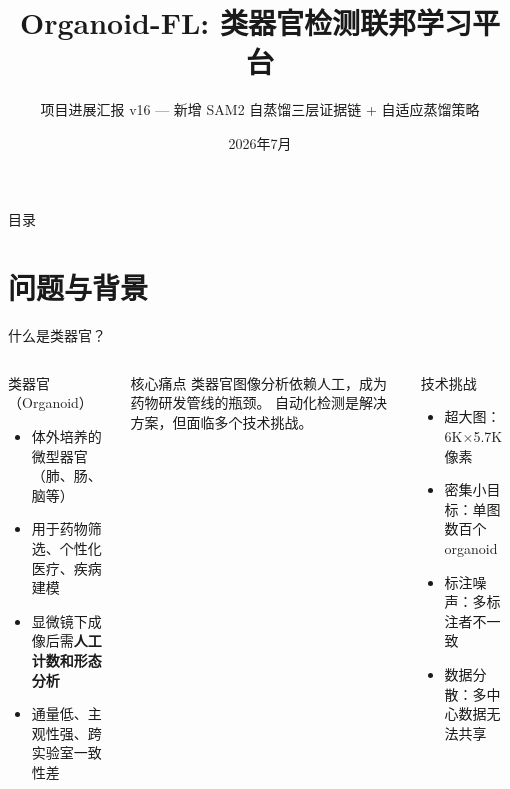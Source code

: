 \documentclass[aspectratio=169, 10pt]{beamer}
\title[Organoid-FL]{Organoid-FL: 类器官检测联邦学习平台}
\subtitle{项目进展汇报 v16 — 新增 SAM2 自蒸馏三层证据链 + 自适应蒸馏策略}
\date{2026年7月}
\begin{document}
\begin{frame}[plain]
  \titlepage
\end{frame}

\begin{frame}{目录}
  \tableofcontents
\end{frame}

\section{问题与背景}

\begin{frame}{什么是类器官？}
  \begin{columns}[T]
    \begin{block}{类器官（Organoid）}
      \begin{itemize}
        \item 体外培养的微型器官（肺、肠、脑等）
        \item 用于药物筛选、个性化医疗、疾病建模
        \item 显微镜下成像后需\textbf{人工计数和形态分析}
        \item 通量低、主观性强、跨实验室一致性差
      \end{itemize}
    \end{block}
    \vspace{0em}
    \begin{alertblock}{核心痛点}
      类器官图像分析依赖人工，成为药物研发管线的瓶颈。
      自动化检测是解决方案，但面临多个技术挑战。
    \end{alertblock}
    \begin{block}{技术挑战}
      \begin{itemize}
        \item \alert{超大图}：6K$\times$5.7K 像素
        \item \alert{密集小目标}：单图数百个 organoid
        \item \alert{标注噪声}：多标注者不一致
        \item \alert{数据分散}：多中心数据无法共享
      \end{itemize}
    \end{block}
  \end{columns}
\end{frame}
\end{document}
